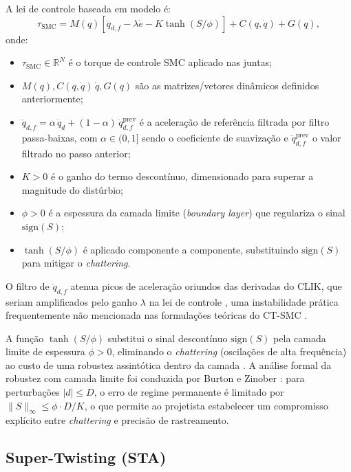 A lei de controle baseada em modelo é:
\begin{equation}
    \tau_{\text{SMC}} = M(q)\left[\ddot{q}_{d,f} - \lambda\dot{e} - K\tanh(S/\phi)\right] + C(q,\dot{q}) + G(q),
    \label{eq:smc_impl}
\end{equation}
onde:
\begin{itemize}
    \item $\tau_{\text{SMC}} \in \mathbb{R}^N$ é o torque de controle SMC aplicado nas juntas;
    \item $M(q), C(q,\dot{q})\,\dot{q}, G(q)$ são as matrizes/vetores dinâmicos definidos anteriormente;
    \item $\ddot{q}_{d,f} = \alpha\,\ddot{q}_d + (1-\alpha)\,\ddot{q}_{d,f}^{\text{prev}}$ é a aceleração de referência filtrada por filtro passa-baixas, com $\alpha \in (0,1]$ sendo o coeficiente de suavização e $\ddot{q}_{d,f}^{\text{prev}}$ o valor filtrado no passo anterior;
    \item $K > 0$ é o ganho do termo descontínuo, dimensionado para superar a magnitude do distúrbio;
    \item $\phi > 0$ é a espessura da camada limite (\textit{boundary layer}) que regulariza o sinal $\text{sign}(S)$;
    \item $\tanh(S/\phi)$ é aplicado componente a componente, substituindo $\text{sign}(S)$ para mitigar o \textit{chattering}.
\end{itemize}
O filtro de $\ddot{q}_{d,f}$ atenua picos de aceleração oriundos das derivadas do CLIK, que seriam amplificados pelo ganho $\lambda$ na lei de controle , uma instabilidade prática frequentemente não mencionada nas formulações teóricas do CT-SMC \cite{slotine1991applied, edwards1998sliding}.

A função $\tanh(S/\phi)$ substitui o sinal descontínuo $\text{sign}(S)$ pela camada limite de espessura $\phi > 0$, eliminando o \textit{chattering} (oscilações de alta frequência) ao custo de uma robustez assintótica dentro da camada \cite{slotine1991applied}. A análise formal da robustez com camada limite foi conduzida por Burton e Zinober \cite{burton1986continuous}: para perturbações $|d| \leq D$, o erro de regime permanente é limitado por $\|S\|_\infty \leq \phi \cdot D / K$, o que permite ao projetista estabelecer um compromisso explícito entre \textit{chattering} e precisão de rastreamento.

\subsection{Super-Twisting (STA)}

